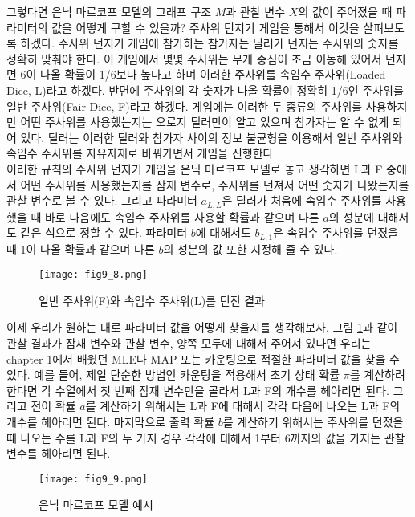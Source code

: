 \documentclass[a4paper]{oblivoir}
\begin{document}
그렇다면 은닉 마르코프 모델의 그래프 구조 $M$과 관찰 변수 $X$의 값이 주어졌을 때 파라미터의 값을 어떻게 구할 수 있을까? 주사위 던지기 게임을 통해서 이것을 살펴보도록 하겠다. 주사위 던지기 게임에 참가하는 참가자는 딜러가 던지는 주사위의 숫자를 정확히 맞춰야 한다. 이 게임에서 몇몇 주사위는 무게 중심이 조금 이동해 있어서 던지면 6이 나올 확률이 1/6보다 높다고 하며 이러한 주사위를 속임수 주사위(Loaded Dice, L)라고 하겠다. 반면에 주사위의 각 숫자가 나올 확률이 정확히 1/6인 주사위를 일반 주사위(Fair Dice, F)라고 하겠다. 게임에는 이러한 두 종류의 주사위를 사용하지만 어떤 주사위를 사용했는지는 오로지 딜러만이 알고 있으며 참가자는 알 수 없게 되어 있다. 딜러는 이러한 딜러와 참가자 사이의 정보 불균형을 이용해서 일반 주사위와 속임수 주사위를 자유자재로 바꿔가면서 게임을 진행한다. \\

이러한 규칙의 주사위 던지기 게임을 은닉 마르코프 모델로 놓고 생각하면 L과 F 중에서 어떤 주사위를 사용했는지를 잠재 변수로, 주사위를 던져서 어떤 숫자가 나왔는지를 관찰 변수로 볼 수 있다. 그리고 파라미터 $a_{L,L}$은 딜러가 처음에 속임수 주사위를 사용했을 때 바로 다음에도 속임수 주사위를 사용할 확률과 같으며 다른 $a$의 성분에 대해서도 같은 식으로 정할 수 있다. 파라미터 $b$에 대해서도 $b_{L,1}$은 속임수 주사위를 던졌을 때 1이 나올 확률과 같으며 다른 $b$의 성분의 값 또한 지정해 줄 수 있다. \\

\begin{figure}[ht] \centering 
\texttt{[image: fig9\_8.png]} 
\caption{일반 주사위(F)와 속임수 주사위(L)를 던진 결과}
\label{fig:9-8}
\end{figure}

이제 우리가 원하는 대로 파라미터 값을 어떻게 찾을지를 생각해보자. 그림 \ref{fig:9-8}과 같이 관찰 결과가 잠재 변수와 관찰 변수, 양쪽 모두에 대해서 주어져 있다면 우리는 chapter 1에서 배웠던 MLE나 MAP 또는 카운팅으로 적절한 파라미터 값을 찾을 수 있다. 예를 들어, 제일 단순한 방법인 카운팅을 적용해서 초기 상태 확률 $\pi$를 계산하려 한다면 각 수열에서 첫 번째 잠재 변수만을 골라서 L과 F의 개수를 헤아리면 된다. 그리고 전이 확률 $a$를 계산하기 위해서는 L과 F에 대해서 각각 다음에 나오는 L과 F의 개수를 헤아리면 된다. 마지막으로 출력 확률 $b$를 계산하기 위해서는 주사위를 던졌을 때 나오는 수를 L과 F의 두 가지 경우 각각에 대해서 1부터 6까지의 값을 가지는 관찰 변수를 헤아리면 된다. \\

\begin{figure}[ht] \centering 
\texttt{[image: fig9\_9.png]} 
\caption{은닉 마르코프 모델 예시}
\label{fig:9-9}
\end{figure}
\end{document}
